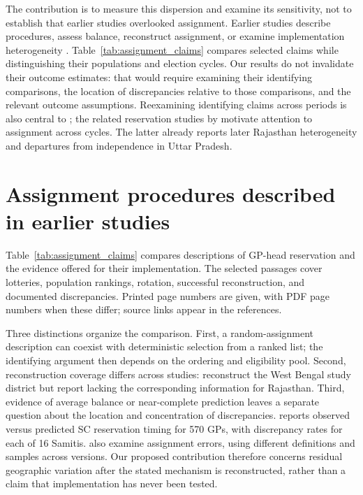 \documentclass[11pt]{article}
\begin{document}
The contribution is to measure this dispersion and examine its sensitivity, not to establish that earlier studies overlooked assignment. Earlier studies describe procedures, assess balance, reconstruct assignment, or examine implementation heterogeneity \citep{chauchard2014,dunning2013,das2023,cdm2025,weaver2024}. Table~\ref{tab:assignment_claims} compares selected claims while distinguishing their populations and election cycles. Our results do not invalidate their outcome estimates: that would require examining their identifying comparisons, the location of discrepancies relative to those comparisons, and the relevant outcome assumptions. Reexamining identifying claims across periods is also central to \citet{green2023}; the related reservation studies by \citet{soodquota,b_green_singh_sood2026} motivate attention to assignment across cycles. The latter already reports later Rajasthan heterogeneity and departures from independence in Uttar Pradesh.

\section{Assignment procedures described in earlier studies}
Table~\ref{tab:assignment_claims} compares descriptions of GP-head reservation and the evidence offered for their implementation. The selected passages cover lotteries, population rankings, rotation, successful reconstruction, and documented discrepancies. Printed page numbers are given, with PDF page numbers when these differ; source links appear in the references.

Three distinctions organize the comparison. First, a random-assignment description can coexist with deterministic selection from a ranked list; the identifying argument then depends on the ordering and eligibility pool. Second, reconstruction coverage differs across studies: \citet{chattopadhyay2004} reconstruct the West Bengal study district but report lacking the corresponding information for Rajasthan. Third, evidence of average balance or near-complete prediction leaves a separate question about the location and concentration of discrepancies. \citet[][Online Appendix B, Table B.2]{chauchard2014} reports observed versus predicted SC reservation timing for 570 GPs, with discrepancy rates for each of 16 Samitis. \citet{b_gajwani_zhang_2008_ifpri_dp807,b_gajwani_zhang_2014_wb_wps6854} also examine assignment errors, using different definitions and samples across versions. Our proposed contribution therefore concerns residual geographic variation after the stated mechanism is reconstructed, rather than a claim that implementation has never been tested.
\end{document}
